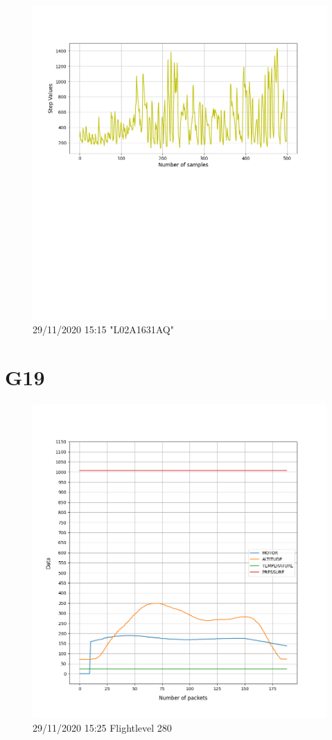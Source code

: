 \documentclass[hidelinks, 12pt, a4paper]{article}
\begin{document}
\begin{figure}[h!]
\centering
	\includegraphics[height=.38\textheight, width=\textwidth]{assets/session2/g18.png}
    \caption{29/11/2020 15:15 "L02A1631AQ"}
\end{figure}


\section{G19}

\begin{figure}[h!]
\centering
	\includegraphics[height=.38\textheight, width=\textwidth]{assets/session2/g19.png}
    \caption{29/11/2020 15:25 Flightlevel 280}
\end{figure}
\end{document}
